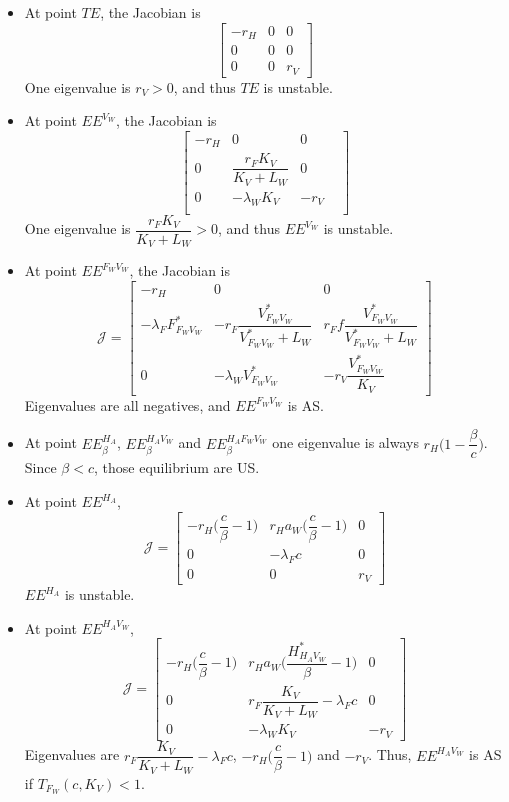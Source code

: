 \documentclass{article}
\newcommand{\lfw}{\lambda_{F}}
\newcommand{\lfv}{\lambda_{W}}
\begin{document}
\begin{itemize}
\item At point $TE$, the Jacobian is
$$
\begin{bmatrix}
-r_H & 0 & 0 \\
0 & 0 & 0  \\
0 & 0 & r_V
\end{bmatrix}
$$
One eigenvalue is $r_V > 0$, and thus $TE$ is unstable.

\item At point $EE^{V_W}$, the Jacobian is
$$
\begin{bmatrix}
-r_H & 0 & 0 \\
0 & \dfrac{r_F K_V}{K_V + L_W} & 0 \\
0  & - \lfv K_V & -r_V & \\
\end{bmatrix}
$$
One eigenvalue is $\dfrac{r_F K_V}{K_V + L_W} > 0$, and thus $EE^{V_W}$ is unstable.

\item At point $EE^{F_WV_W}$, the Jacobian is
$$
\mathcal{J} =
\begin{bmatrix}
-r_H & 0 & 0 \\
-\lfw F_{F_WV_W}^* & -r_F \dfrac{V_{F_WV_W}^*}{V_{F_WV_W}^* +L_W}  & r_F f \dfrac{V_{F_WV_W}^*}{V_{F_WV_W}^* + L_W}\\
0 & - \lfv V_{F_WV_W}^* & -r_V \dfrac{V_{F_WV_W}^*}{K_V}
\end{bmatrix}
$$
Eigenvalues are all negatives, and $EE^{F_WV_W}$ is AS.

\item At point $EE^{H_A}_\beta$, $EE^{H_AV_W}_\beta$ and $EE^{H_AF_WV_W}_\beta$ one eigenvalue is always $r_H \Big(1 - \dfrac{\beta}{c}\Big)$. Since $\beta < c$, those equilibrium are US.

\item At point $EE^{H_A}$,
\begin{equation}
\mathcal{J} =
\begin{bmatrix}
-r_H \Big(\dfrac{c}{\beta}-1\Big) & r_H a_W \Big(\dfrac{c}{\beta}-1\Big) & 0 \\
0 & -\lfw c  & 0 \\
0 & 0 & r_V
\end{bmatrix}
\end{equation}
$EE^{H_A}$ is unstable.


\item At point $EE^{H_AV_W}$,
\begin{equation}
\mathcal{J} =
\begin{bmatrix}
-r_H \Big(\dfrac{c}{\beta}-1\Big) & r_H a_W \Big(\dfrac{H^*_{H_AV_W}}{\beta}-1\Big) & 0 \\
0 & r_F \dfrac{K_V}{K_V + L_W}-\lfw c  & 0 \\
0 & -\lfv K_V & -r_V 
\end{bmatrix}
\end{equation}
Eigenvalues are $r_F\dfrac{K_V}{K_V + L_W}-\lfw c$, $-r_H\Big(\dfrac{c}{\beta}-1\Big)$ and $-r_V$. Thus,  $EE^{H_AV_W}$ is AS if $T_{F_W}(c, K_V) < 1$.


\end{itemize}
\end{document}
